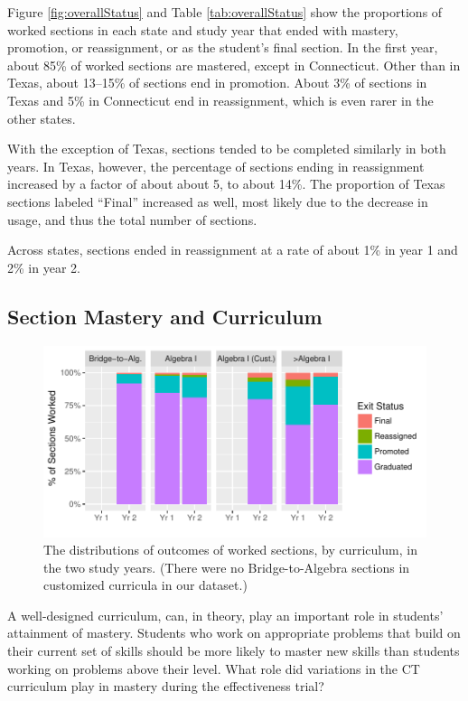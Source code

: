 \documentclass[12pt]{article}\usepackage[]{graphicx}\usepackage[]{color}
\makeatletter
\def\maxwidth{ %
  \ifdim\Gin@nat@width>\linewidth
    \linewidth
  \else
    \Gin@nat@width
  \fi
}
\makeatother
\begin{document}
Figure \ref{fig:overallStatus} and Table \ref{tab:overallStatus} show
the proportions of worked sections in each state and study year that
ended with mastery, promotion, or reassignment, or as the
student's final section.
In the first year, about
85\% of
worked sections are mastered, except in Connecticut.
Other than in Texas, about
13--15\%
of sections end in promotion.
About 3\% of sections in Texas
and 5\%
in Connecticut end in reassignment, which is even rarer in the other states.

With the exception of Texas, sections tended to be completed similarly
in both years.
In Texas, however, the percentage of sections ending in reassignment increased by a factor
of about about
5,
to about 14\%.
The proportion of Texas sections labeled ``Final'' increased as well,
most likely due to the decrease in usage, and thus the total number of
sections.

Across states, sections ended in reassignment at a rate of about
1\% in year 1 and
2\% in year 2.

\subsection{Section Mastery and Curriculum}
\begin{figure}
  \centering

\includegraphics[width=\maxwidth]{figure/statusCur-1} 

\caption{The distributions of outcomes of worked sections, by
  curriculum, in the two study years. (There were no Bridge-to-Algebra
sections in customized curricula in our dataset.)}
\label{fig:statusCur}
\end{figure}

A well-designed curriculum, can, in theory, play an important role in
students' attainment of mastery.
Students who work on appropriate problems that build on their current
set of skills should be more likely to master new skills than students
working on problems above their level.
What role did variations in the CT curriculum play in mastery during the effectiveness trial?
\end{document}
